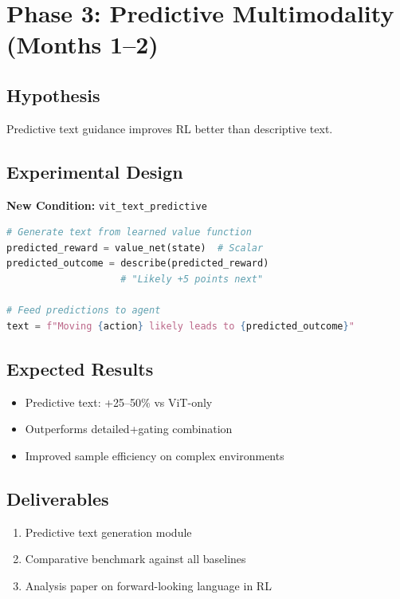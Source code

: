 \documentclass[12pt,a4paper,openany]{report}
\begin{document}
\section{Phase 3: Predictive Multimodality (Months 1--2)}

\subsection{Hypothesis}

Predictive text guidance improves RL better than descriptive text.

\subsection{Experimental Design}

\textbf{New Condition:} \texttt{vit\_text\_predictive}

\begin{lstlisting}[language=Python, caption=Predictive Text Generation from Value Function]
# Generate text from learned value function
predicted_reward = value_net(state)  # Scalar
predicted_outcome = describe(predicted_reward)  
                    # "Likely +5 points next"

# Feed predictions to agent
text = f"Moving {action} likely leads to {predicted_outcome}"
\end{lstlisting}

\subsection{Expected Results}

\begin{itemize}
    \item Predictive text: +25--50\% vs ViT-only
    \item Outperforms detailed+gating combination
    \item Improved sample efficiency on complex environments
\end{itemize}

\subsection{Deliverables}

\begin{enumerate}
    \item Predictive text generation module
    \item Comparative benchmark against all baselines
    \item Analysis paper on forward-looking language in RL
\end{enumerate}
\end{document}
